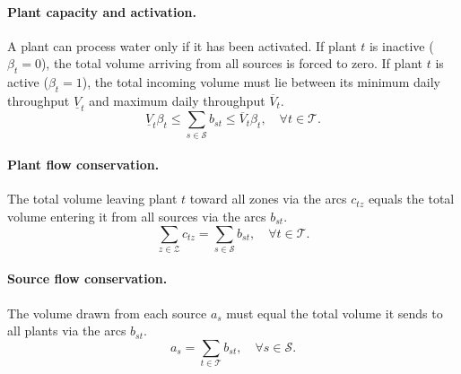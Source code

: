 \documentclass[10pt]{article}
\begin{document}
\paragraph{Plant capacity and activation.}
A plant can process water only if it has been activated.
If plant $t$ is inactive ($\beta_t=0$), the total volume arriving from all sources is forced to zero.
If plant $t$ is active ($\beta_t=1$), the total incoming volume must lie between its minimum daily throughput $\underline{V}_t$ and maximum daily throughput $\overline{V}_t$.
\begin{equation}\label{eq:plant_capacity}
    \underline{V}_t \beta_t
    \leq
    \sum_{s \in \mathcal{S}} b_{st}
    \leq
    \overline{V}_t \beta_t,
    \quad \forall t \in \mathcal{T}.
\end{equation}

\paragraph{Plant flow conservation.}
The total volume leaving plant $t$ toward all zones via the arcs $c_{tz}$ equals the total volume entering it from all sources via the arcs $b_{st}$.
\begin{equation}\label{eq:plant_flow_conservation}
    \sum_{z \in \mathcal{Z}} c_{tz} = \sum_{s \in \mathcal{S}} b_{st},
    \quad \forall t \in \mathcal{T}.
\end{equation}

\paragraph{Source flow conservation.}
The volume drawn from each source $a_{s}$ must equal the total volume it sends to all plants via the arcs $b_{st}$.
\begin{equation}\label{eq:source_flow_conservation}
    a_s = \sum_{t \in \mathcal{T}} b_{st} , \quad \forall s \in \mathcal{S}.
\end{equation}
\end{document}
